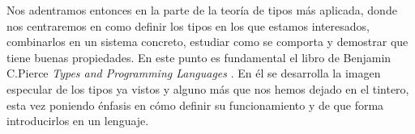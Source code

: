 Nos adentramos entonces en la parte de la teoría de tipos más aplicada, donde nos centraremos en como definir los tipos en los que estamos interesados, combinarlos en un sistema concreto, estudiar como se comporta y demostrar que tiene buenas propiedades. En este punto es fundamental el libro de Benjamin C.Pierce \textit{Types and Programming Languages} \cite{TPL}. En él se desarrolla la imagen especular de los tipos ya vistos y alguno más que nos hemos dejado en el tintero, esta vez poniendo énfasis en cómo definir su funcionamiento y de que forma introducirlos en un lenguaje.\\
